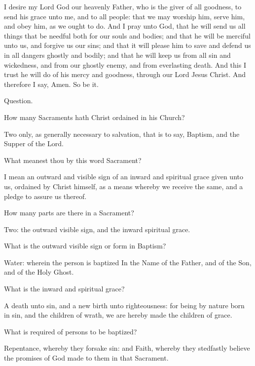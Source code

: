  I desire my Lord God our heavenly Father, who is the giver of all goodness, to send his grace unto me, and to all people: that we may worship him, serve him, and obey him, as we ought to do. And I pray unto God, that he will send us all things that be needful both for our souls and bodies; and that he will be merciful unto us, and forgive us our sins; and that it will please him to save and defend us in all dangers ghostly and bodily; and that he will keep us from all sin and wickedness, and from our ghostly enemy, and from everlasting death. And this I trust he will do of his mercy and goodness, through our Lord Jesus Christ. And therefore I say, Amen. So be it.

\begin{rubric}
Question.
\end{rubric}

How many Sacraments hath Christ ordained in his Church?

   Two only, as generally necessary to salvation, that is to say, Baptism, and the Supper of the Lord.

\newpage

 What meanest thou by this word Sacrament?

   I mean an outward and visible sign of an inward and spiritual grace given unto us, ordained by Christ himself, as a means whereby we receive the same, and a pledge to assure us thereof.

 How many parts are there in a Sacrament?

   Two: the outward visible sign, and the inward spiritual grace.

 What is the outward visible sign or form in Baptism?

   Water: wherein the person is baptized In the Name of the Father, and of the Son, and of the Holy Ghost.

 What is the inward and spiritual grace?

   A death unto sin, and a new birth unto righteousness: for being by nature born in sin, and the children of wrath, we are hereby made the children of grace.

 What is required of persons to be baptized?

   Repentance, whereby they forsake sin: and Faith, whereby they stedfastly believe the promises of God made to them in that Sacrament.

